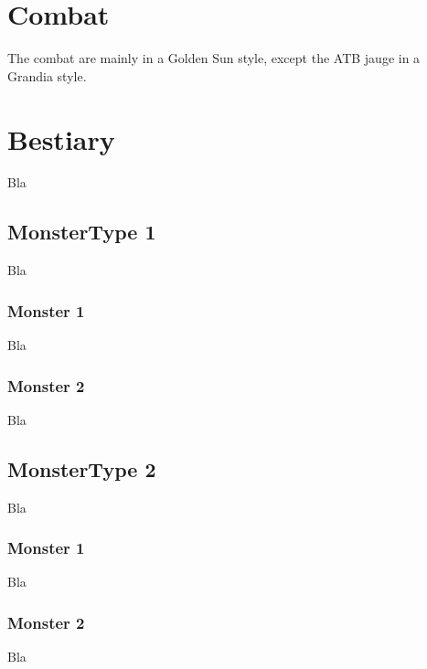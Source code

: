 \documentclass[a4paper,12pt]{book}
\begin{document}
\section{Combat}
The combat are mainly in a Golden Sun style, except the ATB jauge in a Grandia style.
\section{Bestiary}
Bla
\subsection{MonsterType 1}
Bla
\subsubsection{Monster 1}
Bla
\subsubsection{Monster 2}
Bla
\subsection{MonsterType 2}
Bla
\subsubsection{Monster 1}
Bla
\subsubsection{Monster 2}
Bla
\end{document}
